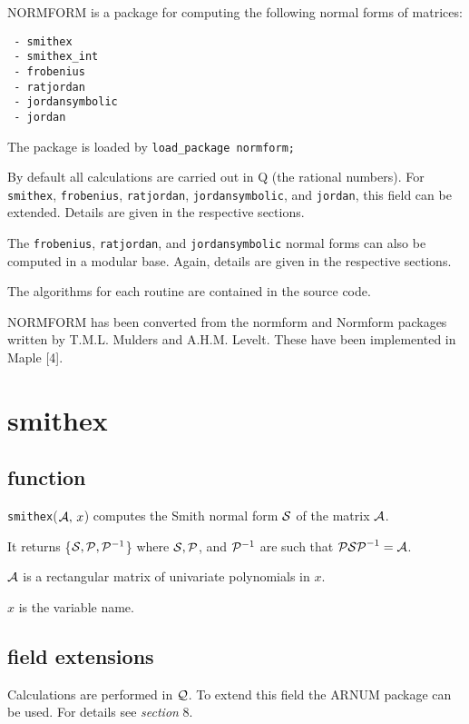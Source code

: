 {\small NORMFORM} is a package for computing the following normal 
forms of matrices:

\begin{verbatim}
 - smithex
 - smithex_int
 - frobenius
 - ratjordan
 - jordansymbolic
 - jordan
\end{verbatim}
 
The package is loaded by {\tt load\_package normform;}

By default all calculations are carried out in {\cal Q} (the rational 
numbers). For {\tt smithex}, {\tt frobenius}, {\tt ratjordan}, 
{\tt jordansymbolic}, and {\tt jordan}, this field can be extended. 
Details are given in the respective sections.

The {\tt frobenius}, {\tt ratjordan}, and {\tt jordansymbolic} normal 
forms can also be computed in a modular base. Again, details are given 
in the respective sections.

The algorithms for each routine are contained in the source code.

{\small NORMFORM} has been converted from the normform and Normform 
packages written by T.M.L. Mulders and A.H.M. Levelt. These have been 
implemented in Maple [4].


\section{smithex}

\subsection{function}

{\tt smithex}(${\cal A},\, x$) computes the Smith normal form ${\cal S}$
of the matrix ${\cal A}$.

It returns \{${\cal S}, {\cal P}, {\cal P}^{-1}$\} where ${\cal S}, 
{\cal P}$, and ${\cal P}^{-1}$ are such that ${\cal P S P}^{-1} = 
{\cal A}$.

${\cal A}$ is a rectangular matrix of univariate polynomials in $x$.

$x$ is the variable name.

\subsection{field extensions}

Calculations are performed in ${\cal Q}$. To extend this field the 
{\small ARNUM} package can be used. For details see {\it section} 8.

